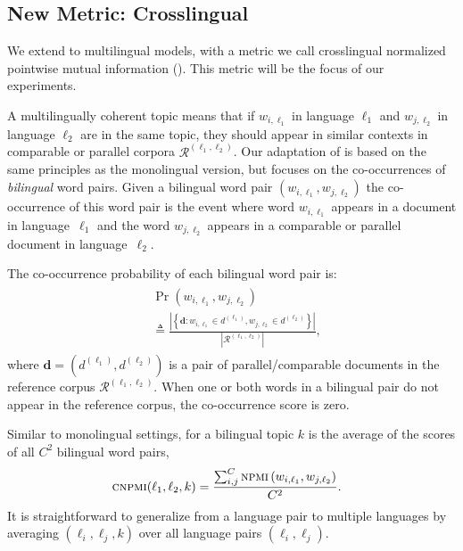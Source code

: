 \subsection{New Metric: Crosslingual \npmi}

We extend \npmi{} to multilingual models, with a metric we
call crosslingual normalized pointwise mutual information (\cnpmi{}).
This metric will be the focus of our experiments.

A multilingually coherent topic means that if $w_{i,\ell_1}$ in language $\ell_1$
and $w_{j,\ell_2}$ in language $\ell_2$ are in the same topic, they should appear
in similar contexts in comparable or parallel corpora
$\mathcal{R}^{(\ell_1,\ell_2)}$.
Our adaptation of \npmi{} is based on the
same principles as the monolingual version,
but focuses on the
co-occurrences of \textit{bilingual} word pairs.
Given a bilingual word pair $\left(w_{i,\ell_1},w_{j,\ell_2}\right)$
the co-occurrence of this word pair is the event
where word $w_{i,\ell_1}$ appears in a document in language~$\ell_1$
and the word $w_{j,\ell_2}$ appears in a comparable or parallel document in language~$\ell_2$.


The co-occurrence probability of each bilingual word pair is:
	\begin{align}
	\begin{split}
		&\Pr\left(w_{i,\ell_1},w_{j,\ell_2}\right) \\ & \triangleq  \frac{\left|\left\lbrace{\mathbf{d}}: w_{i,\ell_1}\in{d}^{(\ell_1)},w_{j,\ell_2}\in{d}^{(\ell_2)}\right\rbrace\right|}{\left|\mathcal{R}^{(\ell_1,\ell_2)}\right|},
	\end{split}
	\end{align}
where $\mathbf{d}=\left(d^{(\ell_1)}, d^{(\ell_2)}\right)$ is
a pair of parallel/comparable documents in the
reference corpus $\mathcal{R}^{(\ell_1,\ell_2)}$. 
When one or both words in a bilingual pair do not appear in the reference
corpus, the co-occurrence score is zero.











        
        
        
        
	
	
	


Similar to monolingual settings,
\cnpmi{}
for a bilingual topic $k$ is the average of the
\npmi{} scores of all $C^2$ bilingual word pairs,
\begin{align}\hspace{-8.5pt}
\textsc{cnpmi}{}(\ell_1,\ell_2,k) = \frac{\sum_{i,j}^{C}\textsc{npmi}{}\left(w_{i,\ell_1},w_{j,\ell_2}\right)}{C^2}.
\end{align}
It is straightforward to generalize \cnpmi{} from a language pair to multiple
languages by averaging \cnpmi$(\ell_i,\ell_j,k)$ over all language
pairs $(\ell_i,\ell_j)$.